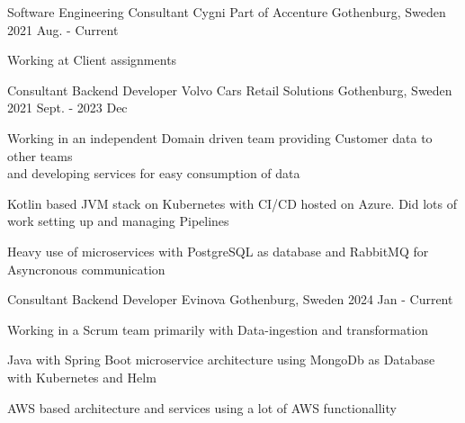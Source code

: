 
\begin{cventries}
  \cventry
    {Software Engineering Consultant}
    {Cygni Part of Accenture}
    {Gothenburg, Sweden}
    {2021 Aug. - Current}
    { 
    \begin{cvitems}
        \item {Working at Client assignments}
    \end{cvitems}
    }
  \cventry
    {Consultant Backend Developer}
    {Volvo Cars Retail Solutions}
    {Gothenburg, Sweden}
    {2021 Sept. - 2023 Dec}
    {
        \begin{cvitems}
            \item {Working in an independent Domain driven team providing Customer data to other teams \\ and developing services for easy consumption of data}
            \item {Kotlin based JVM stack on Kubernetes with CI/CD hosted on Azure. Did lots of work setting up and managing Pipelines}
            \item {Heavy use of microservices with PostgreSQL as database and RabbitMQ for Asyncronous communication}
        \end{cvitems}
    }
  \cventry
    {Consultant Backend Developer}
    {Evinova}
    {Gothenburg, Sweden}
    {2024 Jan - Current}
    {
        \begin{cvitems}
            \item {Working in a Scrum team primarily with Data-ingestion and transformation}
            \item {Java with Spring Boot microservice architecture using MongoDb as Database with Kubernetes and Helm}
            \item {AWS based architecture and services using a lot of AWS functionallity}
        \end{cvitems}
    }
    

\end{cventries}
